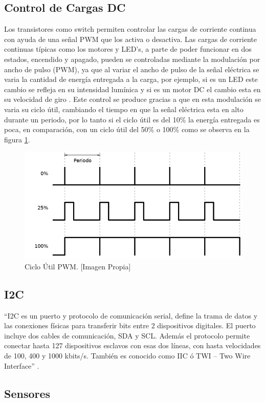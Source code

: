 \subsection{Control de Cargas DC}

Los transistores como switch permiten controlar las cargas de corriente continua con ayuda de una señal PWM que los activa o desactiva. Las cargas de corriente continuas típicas como los motores y LED's, a parte de poder funcionar en dos estados, encendido y apagado, pueden se controladas mediante la modulación por ancho de pulso (PWM), ya que al variar el ancho de pulso de la señal eléctrica se varia la cantidad de energía entregada a la carga, por ejemplo, si es un LED este cambio se refleja en su intensidad lumínica y si es un motor DC el cambio esta en su velocidad de giro \cite{PWM}. Este control se produce gracias a que en esta modulación se varia su ciclo útil, cambiando el tiempo en que la señal eléctrica esta en alto durante un periodo, por lo tanto si el ciclo útil es del 10\% la energía entregada es poca, en comparación, con un ciclo útil del 50\% o 100\% como se observa en la figura \ref{fig:pwm-duty-800x396}.

\begin{figure}[H]
	\centering
	\caption{Ciclo Útil PWM. [Imagen Propia] }
	\label{fig:pwm-duty-800x396}
	\includegraphics[width=0.5\linewidth]{Imagenes/pwm}
\end{figure}


\subsection{I2C}

``I2C es un puerto y protocolo de comunicación serial, define la trama de datos y las conexiones físicas para transferir bits entre 2 dispositivos digitales. El puerto incluye dos cables de comunicación, SDA y SCL. Además el protocolo permite conectar hasta 127 dispositivos esclavos con esas dos líneas, con hasta velocidades de 100, 400 y 1000 kbits/s. También es conocido como IIC ó TWI – Two Wire Interface'' \cite{I2C}.

\subsection{Sensores}

